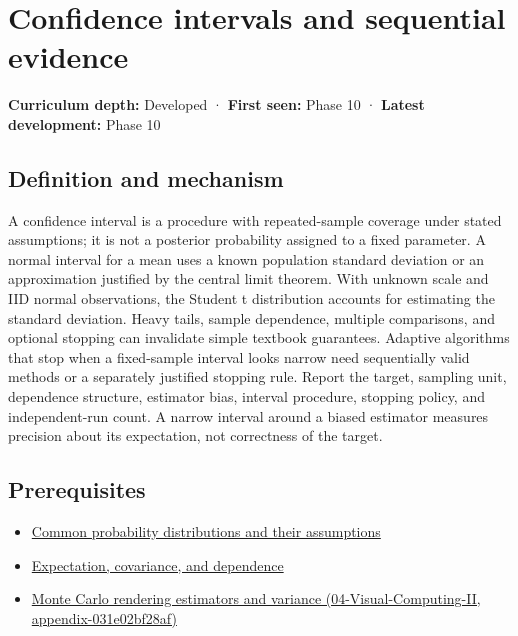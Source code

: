 \hypertarget{appendix-c83016554b1e}{}
\section{Confidence intervals and sequential evidence}\label{appendix-c83016554b1e-confidence-intervals-and-sequential-evidence}

\textbf{Curriculum depth:} Developed · \textbf{First seen:} Phase 10 · \textbf{Latest development:} Phase 10

\subsection{Definition and mechanism}\label{appendix-c83016554b1e-definition-and-mechanism}

A confidence interval is a procedure with repeated-sample coverage under stated assumptions; it is not a posterior probability assigned to a fixed parameter. A normal interval for a mean uses a known population standard deviation or an approximation justified by the central limit theorem. With unknown scale and IID normal observations, the Student t distribution accounts for estimating the standard deviation. Heavy tails, sample dependence, multiple comparisons, and optional stopping can invalidate simple textbook guarantees. Adaptive algorithms that stop when a fixed-sample interval looks narrow need sequentially valid methods or a separately justified stopping rule. Report the target, sampling unit, dependence structure, estimator bias, interval procedure, stopping policy, and independent-run count. A narrow interval around a biased estimator measures precision about its expectation, not correctness of the target.

\subsection{Prerequisites}\label{appendix-c83016554b1e-prerequisites}

\begin{itemize}
\tightlist
\item
  \hyperref[appendix-a2360b435383]{Common probability distributions and their assumptions}
\item
  \hyperref[appendix-54c383df9992]{Expectation, covariance, and dependence}
\item
  \href{../04-Visual-Computing-II/main.pdf\#nameddest=appendix-031e02bf28af}{Monte Carlo rendering estimators and variance (04-Visual-Computing-II, appendix-031e02bf28af)}
\end{itemize}

